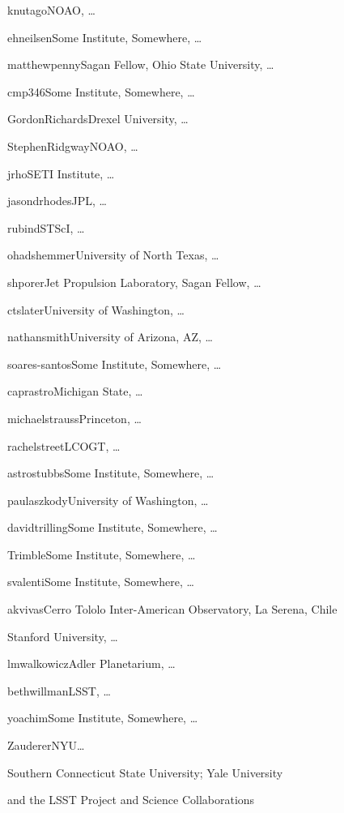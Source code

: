 \author{Knut Olsen}{knutago}{NOAO, \ldots}
\author{Eric Neilsen}{ehneilsen}{Some Institute, Somewhere, \ldots}
\author{Matthew T. Penny}{matthewpenny}{Sagan Fellow, Ohio State University, \ldots}
\author{Christina Peters}{cmp346}{Some Institute, Somewhere, \ldots}
\author{Gordon Richards}{GordonRichards}{Drexel University, \ldots}
\author{Stephen Ridgway}{StephenRidgway}{NOAO, \ldots}
\author{Jeonghee Rho}{jrho}{SETI Institute, \ldots}
\author{Jason Rhodes}{jasondrhodes}{JPL, \ldots}
\author{David Rubin}{rubind}{STScI, \ldots}
\author{Ohad Shemmer}{ohadshemmer}{University of North Texas, \ldots}
\author{Avi Shporer}{shporer}{Jet Propulsion Laboratory, Sagan Fellow, \ldots}
\author{Colin Slater}{ctslater}{University of Washington, \ldots}
\author{Nathan Smith}{nathansmith}{University of Arizona, AZ, \ldots}
\author{Marcelles Soares-Santos}{soares-santos}{Some Institute, Somewhere, \ldots}
\author{Jay Strader}{caprastro}{Michigan State, \ldots}
\author{Michael Strauss}{michaelstrauss}{Princeton, \ldots}
\author{Rachel Street}{rachelstreet}{LCOGT, \ldots}
\author{Christopher Stubbs}{astrostubbs}{Some Institute, Somewhere, \ldots}
\author{Paula Szkody}{paulaszkody}{University of Washington, \ldots}
\author{David Trilling}{davidtrilling}{Some Institute, Somewhere, \ldots}
\author{Virginia Trimble}{Trimble}{Some Institute, Somewhere, \ldots}
\author{Stefano Valenti}{svalenti}{Some Institute, Somewhere, \ldots}
\author{Kathy Vivas}{akvivas}{Cerro Tololo Inter-American Observatory, La Serena, Chile}
\author{Robert Wagoner}{}{Stanford University, \ldots}
\author{Lucianne Walkowicz}{lmwalkowicz}{Adler Planetarium, \ldots}
\author{Beth Willman}{bethwillman}{LSST, \ldots}
\author{Peter Yoachim}{yoachim}{Some Institute, Somewhere, \ldots}
\author{Bevin Ashley Zauderer}{Zauderer}{NYU\ldots}
\author{Dana I. Casetti-Dinescu}{Southern Connecticut State University; Yale University}

{and the LSST Project and Science Collaborations}
